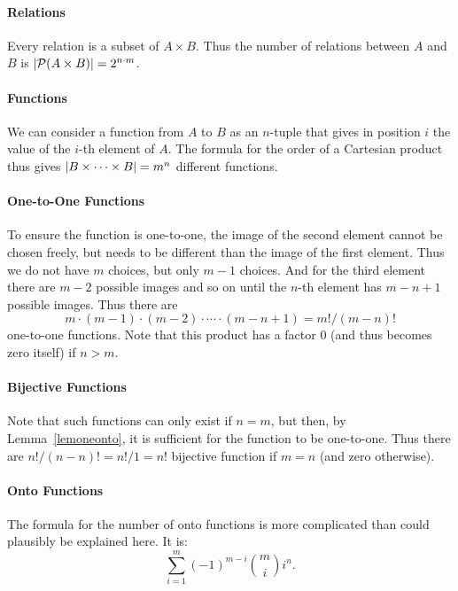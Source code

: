 \paragraph{Relations}
Every relation is a subset of $A\times B$. Thus the number of relations between $A$ and
$B$ is $\left|{\mathcal P}(A\times B)\right|=2^{n\cdot m}$.

\paragraph{Functions}
We can consider a function from $A$ to $B$ as an $n$-tuple that gives in position $i$
the value of the $i$-th element of $A$. The formula for the order of a Cartesian product
thus gives $\left|B\times \cdots\times B\right|=m^n$ different functions.

\paragraph{One-to-One Functions}
To ensure the function is one-to-one, the image of the second element cannot be chosen
freely, but needs to be different than the image of the first element. Thus we do not
have $m$ choices, but only $m-1$ choices. And for the third element there are $m-2$
possible images and so on until the $n$-th element has $m-n+1$ possible images. Thus there are
\[
m\cdot (m-1)\cdot (m-2)\cdot \cdots\cdot (m-n+1)=m!/(m-n)!
\]
one-to-one functions. Note that this product has a factor $0$ (and thus becomes zero
itself) if $n>m$.

\paragraph{Bijective Functions}
Note that such functions can only exist if $n=m$, but then, by Lemma~\ref{lemoneonto},
it is sufficient for the function to be one-to-one. Thus there are $n!/(n-n)!=n!/1=n!$
bijective function if $m=n$ (and zero otherwise).

\paragraph{Onto Functions}
The formula for the number of onto functions is more complicated than could plausibly be
explained here. It is:
\[
\sum_{i=1}^m (-1)^{m-i}{m\choose i}i^n.
\]


